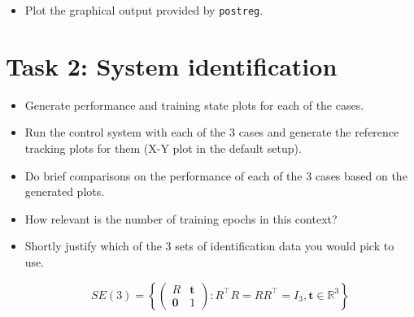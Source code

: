 \documentclass[a4paper,12pt]{article}
\begin{document}
\begin{itemize}
	
	\item Plot the graphical output provided by \texttt{postreg}.

\end{itemize}


\section{Task 2: System identification}

\begin{itemize}

	\item Generate performance and training state plots for each of the cases.


	\item Run the control system with each of the 3 cases and generate the reference tracking plots for them (X-Y plot in the default setup).

	\item Do brief comparisons on the performance of each of the 3 cases based on the generated plots.

	\item How relevant is the number of training epochs in this context?

	\item Shortly justify which of the 3 sets of identification data you would pick to use.

	\begin{equation}
	SE(3) = \left\{
	\begin{pmatrix}
	R & \mathbf{t} \\ \mathbf{0} & 1
	\end{pmatrix}
	:
	R^\top R = R R^\top = I_3, \mathbf{t}\in\mathbb{R}^3
	\right\}
	\end{equation}
	
\end{itemize}
\end{document}
